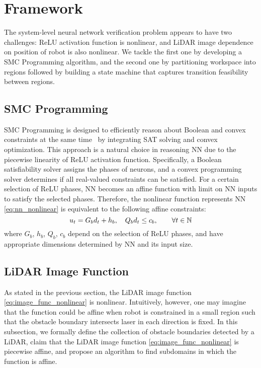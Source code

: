 \section{Framework}

The system-level neural network verification problem appears to have two challenges:
ReLU activation function is nonlinear, and LiDAR image dependence on position of robot is also nonlinear.
We tackle the first one by developing a SMC Programming algorithm,
and the second one by partitioning workspace into regions followed by building a state machine 
that captures transition feasibility between regions.


\subsection{SMC Programming}

SMC Programming is designed to efficiently reason about Boolean and convex constraints 
at the same time~\cite{Shoukry2018SMC} by integrating SAT solving and convex optimization.
This approach is a natural choice in reasoning NN due to the piecewise linearity of ReLU activation function.
Specifically, a Boolean satisfiability solver assigns the phases of neurons, and a convex programming solver 
determines if all real-valued constraints can be satisfied. 
For a certain selection of ReLU phases, NN becomes an affine function with limit on NN inputs to satisfy the selected phases. 
Therefore, the nonlinear function represents NN \eqref{eq:nn_nonlinear} is equivalent to the following affine constraints:
\begin{equation}
    \label{eq:nn_linear}  
    u_t =  G_b d_t + h_b, \quad Q_b d_t \le c_b, \qquad \forall t \in {\mathbb{N}} 
\end{equation}
where $G_b$, $h_b$, $Q_b$, $c_b$ depend on the selection of ReLU phases, and have appropriate dimensions 
determined by NN and its input size.




\subsection{LiDAR Image Function}

As stated in the previous section, the LiDAR image function \eqref{eq:image_func_nonlinear} is nonlinear.
Intuitively, however, one may imagine that the function could be affine when robot is constrained in a small region 
such that the obstacle boundary intersects laser in each direction is fixed.
In this subsection, we formally define the collection of obstacle boundaries detected by a LiDAR, 
claim that the LiDAR image function \eqref{eq:image_func_nonlinear} is piecewise affine, 
and propose an algorithm to find subdomains in which the function is affine.


